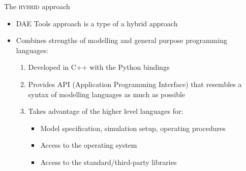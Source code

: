 \documentclass[compress,newPxFont,sthlmFooter]{beamer}
\begin{document}
\begin{frame}{The \textsc{hybrid} approach}
  \begin{itemize}
    \item DAE Tools approach is a \alert{type of a hybrid approach}
    \item Combines strengths of \alert{modelling} and \alert{general purpose} programming languages:
        \begin{enumerate}
            \item \alert{Developed in C++} with the \alert{Python bindings}
            \item Provides \alert{API} (Application Programming Interface) that \alert{resembles a syntax of modelling languages}
                  as much as possible
            \item \alert{Takes advantage of the higher level languages} for:
                \begin{itemize}
                    \item Model specification, simulation setup, operating procedures
                    \item Access to the operating system 
                    \item Access to the standard/third-party libraries
                \end{itemize}
        \end{enumerate}
  \end{itemize}
\end{frame}
\end{document}
